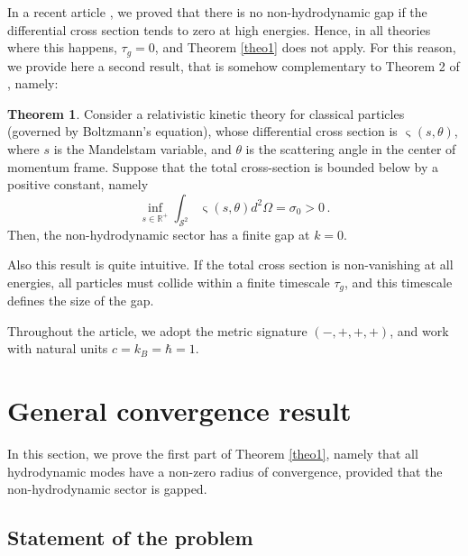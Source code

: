 \documentclass[a4paper, amsfonts, amssymb, amsmath, reprint, showkeys, nofootinbib, twoside, onecolumn,notitlepage]{revtex4-2}
\theoremstyle{definition}
\theoremstyle{theorem}
\newtheorem{theorem}{Theorem}
\theoremstyle{corollary}
\begin{document}
In a recent article \cite{GavassinoGapless2024rck}, we proved that there is no non-hydrodynamic gap if the differential cross section tends to zero at high energies. Hence, in all theories where this happens, $\tau_g=0$, and Theorem \ref{theo1} does not apply. For this reason, we provide here a second result, that is somehow complementary to Theorem 2 of \cite{GavassinoGapless2024rck}, namely: 
\begin{theorem}\label{theo2}
Consider a relativistic kinetic theory for classical particles (governed by Boltzmann's equation), whose differential cross section is $\upvarsigma(s,\theta)$, where $s$ is the Mandelstam variable, and $\theta$ is the scattering angle in the center of momentum frame. Suppose that the total cross-section is bounded below by a positive constant, namely
\begin{equation}\label{assuziuz}
\inf_{s\in \mathbb{R}^+} \int_{\mathcal{S}^2} \upvarsigma(s,\theta) d^2\Omega=\sigma_0 >0 \, .
\end{equation}
Then, the non-hydrodynamic sector has a finite gap at $k=0$.
\end{theorem}
Also this result is quite intuitive. If the total cross section is non-vanishing at all energies, all particles must collide within a finite timescale $\tau_g$, and this timescale defines the size of the gap.


Throughout the article, we adopt the metric signature $(-,+,+,+)$, and work with natural units $c{=}k_B{=}\hbar{=}1$.


\section{General convergence result}\label{generone}

In this section, we prove the first part of Theorem \ref{theo1}, namely that all hydrodynamic modes have a non-zero radius of convergence, provided that the non-hydrodynamic sector is gapped.

\subsection{Statement of the problem}
\end{document}
